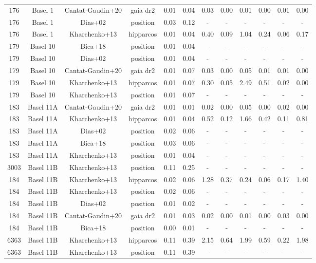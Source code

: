 \begin{sidewaystable}[p]
\begin{tabular}{*{12}{c}}
176 & Basel 1 & Cantat-Gaudin+20 & gaia dr2 & 0.01 & 0.04 & 0.03 & 0.00 & 0.01 & 0.00 & 0.01 & 0.00\\
176 & Basel 1 & Dias+02 & position & 0.03 & 0.12 & - & - & - & - & - & -\\
176 & Basel 1 & Kharchenko+13 & hipparcos & 0.01 & 0.04 & 0.40 & 0.09 & 1.04 & 0.24 & 0.06 & 0.17\\
179 & Basel 10 & Bica+18 & position & 0.01 & 0.04 & - & - & - & - & - & -\\
179 & Basel 10 & Dias+02 & position & 0.01 & 0.04 & - & - & - & - & - & -\\
179 & Basel 10 & Cantat-Gaudin+20 & gaia dr2 & 0.01 & 0.07 & 0.03 & 0.00 & 0.05 & 0.01 & 0.01 & 0.00\\
179 & Basel 10 & Kharchenko+13 & hipparcos & 0.01 & 0.07 & 0.30 & 0.05 & 2.49 & 0.51 & 0.02 & 0.00\\
179 & Basel 10 & Kharchenko+13 & position & 0.01 & 0.07 & - & - & - & - & - & -\\
183 & Basel 11A & Cantat-Gaudin+20 & gaia dr2 & 0.01 & 0.01 & 0.02 & 0.00 & 0.05 & 0.00 & 0.02 & 0.00\\
183 & Basel 11A & Kharchenko+13 & hipparcos & 0.01 & 0.04 & 0.52 & 0.12 & 1.66 & 0.42 & 0.11 & 0.81\\
183 & Basel 11A & Dias+02 & position & 0.02 & 0.06 & - & - & - & - & - & -\\
183 & Basel 11A & Bica+18 & position & 0.03 & 0.06 & - & - & - & - & - & -\\
183 & Basel 11A & Kharchenko+13 & position & 0.01 & 0.04 & - & - & - & - & - & -\\
3003 & Basel 11B & Kharchenko+13 & position & 0.11 & 0.25 & - & - & - & - & - & -\\
184 & Basel 11B & Kharchenko+13 & hipparcos & 0.02 & 0.06 & 1.28 & 0.37 & 0.24 & 0.06 & 0.17 & 1.40\\
184 & Basel 11B & Kharchenko+13 & position & 0.02 & 0.06 & - & - & - & - & - & -\\
184 & Basel 11B & Dias+02 & position & 0.01 & 0.02 & - & - & - & - & - & -\\
184 & Basel 11B & Cantat-Gaudin+20 & gaia dr2 & 0.01 & 0.03 & 0.02 & 0.00 & 0.01 & 0.00 & 0.03 & 0.00\\
184 & Basel 11B & Bica+18 & position & 0.00 & 0.01 & - & - & - & - & - & -\\
6363 & Basel 11B & Kharchenko+13 & hipparcos & 0.11 & 0.39 & 2.15 & 0.64 & 1.99 & 0.59 & 0.22 & 1.98\\
6363 & Basel 11B & Kharchenko+13 & position & 0.11 & 0.39 & - & - & - & - & - & -\\

\end{tabular}
\end{sidewaystable}
